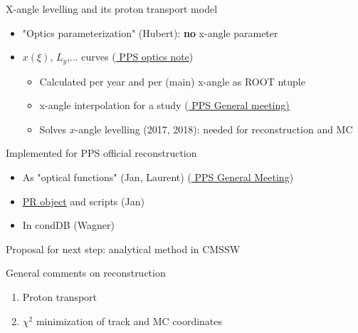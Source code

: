 \documentclass{beamer}
\begin{document}
\begin{frame}\scriptsize
	\begin{block}{X-angle levelling and its proton transport model}
	\begin{itemize}
		\item "Optics parameterization" (Hubert): {\bf\color{red} no} x-angle parameter
		\item $x(\xi)$, $L_{y}$,... curves (\href{http://cds.cern.ch/record/2256433?ln=en}{\color{blue} \underline{\ttfamily PPS optics note}})
		\begin{itemize}\scriptsize
			\item Calculated per year and per (main) x-angle as ROOT ntuple
			\item x-angle interpolation for a study (\href{https://indico.cern.ch/event/760670/contributions/3161720/attachments/1726564/2789229/PPS_General_meeting_analytical_reconstruction.pdf}{\color{blue} \underline{\ttfamily PPS General meeting})}
			\item Solves $x$-angle levelling (2017, 2018): needed for reconstruction and MC

		\end{itemize}
	\end{itemize}
	Implemented for PPS official reconstruction 
	\begin{itemize}\scriptsize
			\item As "optical functions" (Jan, Laurent) (\href{https://indico.cern.ch/event/794378/contributions/3300540/attachments/1790677/2917159/jan_kaspar_reco_sw.pdf}{\color{blue} \underline{\ttfamily PPS General Meeting}})\vspace{-1mm}
			\item  \href{https://github.com/CTPPS/cmssw/tree/ctpps_initial_proton_reconstruction_CMSSW_10_2_0/RecoCTPPS/ProtonReconstruction}{\color{blue} \underline{\ttfamily PR object}} and scripts (Jan)\vspace{-1mm}
			\item In condDB (Wagner)
	\end{itemize}	

	
	
	\vspace{2mm}
	

	Proposal for next step: analytical method in CMSSW

	\end{block}

	\begin{block}{General comments on reconstruction}
	\begin{enumerate}
		\item Proton transport
		\item $\chi^{2}$ minimization of track and MC coordinates
	\end{enumerate}

	\end{block}

\end{frame}
\end{document}
